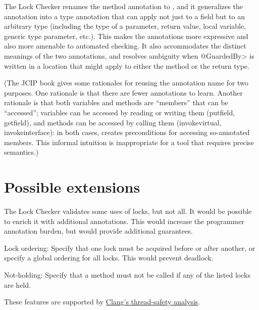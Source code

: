 The Lock Checker renames the method annotation to
, and it generalizes the
 annotation into a type annotation
that can apply not just to a field but to an arbitrary type (including the
type of a parameter, return value, local variable, generic type parameter,
etc.).  This makes the annotations more expressive and also more amenable
to automated checking.  It also accommodates the distinct
meanings of the two annotations, and resolves ambiguity when \<@GuardedBy>
is written in a location that might apply to either the method or the
return type.

(The JCIP book gives some rationales for reusing the annotation name for
two purposes.  One rationale is
that there are fewer annotations to learn.  Another rationale is
that both variables and methods are ``members'' that can be ``accessed'';
variables can be accessed by reading or writing them (putfield, getfield),
and methods can be accessed by calling them (invokevirtual,
invokeinterface):  in both cases,  creates preconditions
for accessing so-annotated members.  This informal intuition is
inappropriate for a tool that requires precise semantics.)



\section{Possible extensions\label{lock-extensions}}

The Lock Checker validates some uses of locks, but not all.  It would be
possible to enrich it with additional annotations.  This would increase the
programmer annotation burden, but would provide additional guarantees.

Lock ordering:  Specify that one lock must be acquired before or after
another, or specify a global ordering for all locks.  This would prevent
deadlock.

Not-holding:  Specify that a method must not be called if any of the listed
locks are held.

These features are supported by
\href{http://clang.llvm.org/docs/ThreadSafetyAnalysis.html}{Clang's
  thread-safety analysis}.


